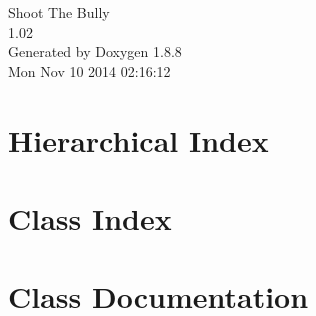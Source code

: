 \documentclass[twoside]{book}
\newcommand{\+}{\discretionary{\mbox{\scriptsize$\hookleftarrow$}}{}{}}
\newcommand{\clearemptydoublepage}{%
  \newpage{\pagestyle{empty}\cleardoublepage}%
}
\begin{document}
\hypersetup{pageanchor=false,
             bookmarks=true,
             bookmarksnumbered=true,
             pdfencoding=unicode
            }
\begin{titlepage}
\vspace*{7cm}
\begin{center}%
{\Large Shoot The Bully \\[1ex]\large 1.\+02 }\\
\vspace*{1cm}
{\large Generated by Doxygen 1.8.8}\\
\vspace*{0.5cm}
{\small Mon Nov 10 2014 02:16:12}\\
\end{center}
\end{titlepage}
\clearemptydoublepage
\tableofcontents
\clearemptydoublepage
{}
\hypersetup{pageanchor=true}

\chapter{Hierarchical Index}

\chapter{Class Index}

\chapter{Class Documentation}


























































\newpage
{}
{}
\printindex
\end{document}
